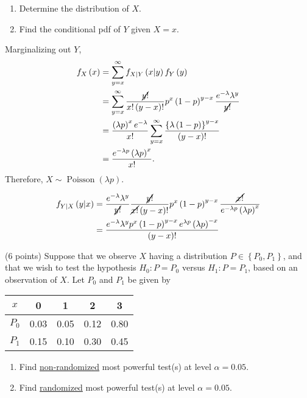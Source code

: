 \documentclass[answers]{exam}
\newcommand{\opn}{\operatorname}
\begin{document}
\begin{questions}
   \begin{enumerate}[label=(\alph*)]
   \item Determine the distribution of $X$.
   \item Find the conditional pdf of $Y$ given $X=x$.
   \end{enumerate}
   \begin{solution}
   Marginalizing out $Y$,
   \begin{align*}
   f_{X}\left(x\right) &= \sum_{y=x}^{\infty}f_{X|Y}\left(x|y\right)f_{Y}\left(y\right)\\
   &= \sum_{y=x}^{\infty}\frac{\cancel{y!}}{x!\left(y-x\right)!}p^{x}\left(1-p\right)^{y-x}\frac{e^{-\lambda}\lambda^{y}}{\cancel{y!}}\\
   &= \frac{\left(\lambda p\right)^{x}e^{-\lambda}}{x!}\sum_{y=x}^{\infty} \frac{\left\{\lambda\left(1-p\right)\right\}^{y-x}}{\left(y-x\right)!}\\
   &= \frac{e^{-\lambda p} \left(\lambda p\right)^{x}}{x!}.
   \end{align*}
   Therefore, $X \sim \opn{Poisson}\left(\lambda p\right)$.
   \end{solution}
   \begin{solution}
   \begin{align*}
      f_{Y|X}\left(y|x\right) &= \frac{e^{-\lambda}\lambda^{y}}{\cancel{y!}} \frac{\cancel{y!}}{\cancel{x!}\left(y-x\right)!}p^{x}\left(1-p\right)^{y-x} \frac{\cancel{x!}}{e^{-\lambda p}\left(\lambda p\right)^{x}}\\
      &= \frac{e^{-\lambda}\lambda^{y}p^{x}\left(1-p\right)^{y-x}e^{\lambda p}\left(\lambda p\right)^{-x}}{\left(y-x\right)!}
   \end{align*}
   \end{solution}
   \question
   (6 points) Suppose that we observe $X$ having a distribution $P \in \left\{P_{0}, P_{1} \right\}$, and that we wish to test the hypothesis $H_{0}: P= P_{0}$ versus $H_{1}: P=P_{1}$, based on an observation of $X$. Let $P_{0}$ and $P_{1}$ be given by
   \begin{table}[!htbp]
      \centering
        \begin{tabular}{*5c}
          \toprule
          $x$ & 0 & 1 & 2 & 3\\
          \midrule
          $P_{0}$ & 0.03 & 0.05 & 0.12 & 0.80\\
          $P_{1}$ & 0.15 & 0.10 & 0.30 & 0.45\\
          \bottomrule
        \end{tabular}
      \end{table}
   \begin{enumerate}[label=(\alph*)]
      \item Find \underline{non-randomized} most powerful test(s) at level $\alpha = 0.05$.
      \item Find \underline{randomized} most powerful test(s) at level $\alpha=0.05$.
   \end{enumerate}
   \begin{solution}


\end{solution}
\end{questions}
\end{document}
